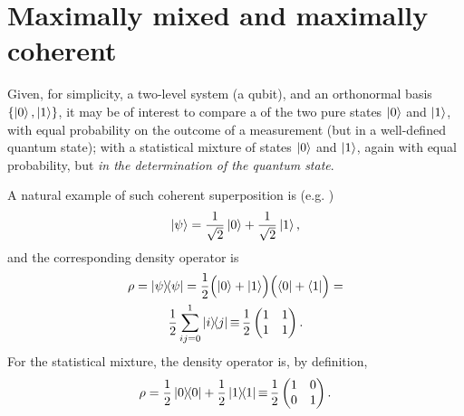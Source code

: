 \section{Maximally mixed and maximally coherent}
\label{sec:mix}

Given, for simplicity, a two-level system (a qubit), and an orthonormal basis
$\left\{\ket{0}, \ket{1}\right\}$, it may be of interest to compare a 
of the two pure states $\ket{0}$ and $\ket{1}$, with equal probability on the outcome of
a measurement (but in a well-defined quantum state); with a statistical mixture of
states $\ket{0}$ and $\ket{1}$, again with equal probability, but 
\emph{in the determination of the quantum state}.

A natural example of such coherent superposition is (e.g. \cite[Example 2.4]{Nakahara})
\[
  \ket{\psi} = \frac{1}{\sqrt{2}}\ket{0} + \frac{1}{\sqrt{2}}\ket{1}\text{,}
\]
and the corresponding density operator is
\begin{multline}\label{eq:matrix:pure}
  \rho = \ketbra{\psi}{\psi} =
  \frac{1}{2}\qty\Big(\ket{0} + \ket{1}) \qty\Big(\bra{0} + \bra{1}) =
  \\
  \frac{1}{2}\sum_{ij=0}^1\ketbra{i}{j} \operatorname*{\equiv}
  \frac{1}{2}
    \begin{pmatrix}
      1 &1  \\
      1 &1  \\
    \end{pmatrix}
  \text{.}
\end{multline}
For the statistical mixture, the density operator is, by definition,
\begin{equation}\label{eq:matrix:mix}
  \rho = \frac{1}{2}\ketbra{0}{0} + \frac{1}{2}\ketbra{1}{1} \operatorname*{\equiv}
  \frac{1}{2}
    \begin{pmatrix}
      1 &0  \\
      0 &1  \\
    \end{pmatrix}
  \text{.}
\end{equation}

